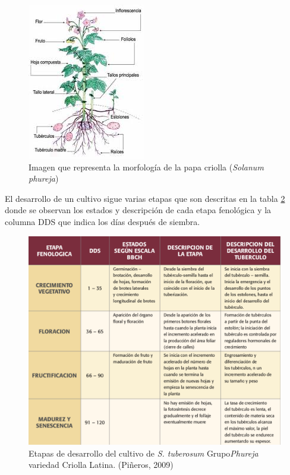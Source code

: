 \begin{figure}[h!]
	\centering
	\includegraphics[scale=0.7]{planta.jpeg}
	\caption{Imagen que representa la morfología de la papa criolla (\textit{Solanum phureja})}
	\label{fig:planta}
\end{figure}

El desarrollo de un cultivo sigue varias etapas que son descritas en la tabla \ref{fig:cultivo} donde se observan los estados y descripción de cada etapa fenológica y la columna DDS que indica los días después de siembra.\\

\begin{figure}[h!]
	\centering
	\includegraphics[scale=0.8]{papas.png}
	\caption{Etapas de desarrollo del cultivo de \textit{S. tuberosum} Grupo\textit{Phureja} variedad Criolla Latina. (Piñeros, 2009)}
	\label{fig:cultivo}
\end{figure}

